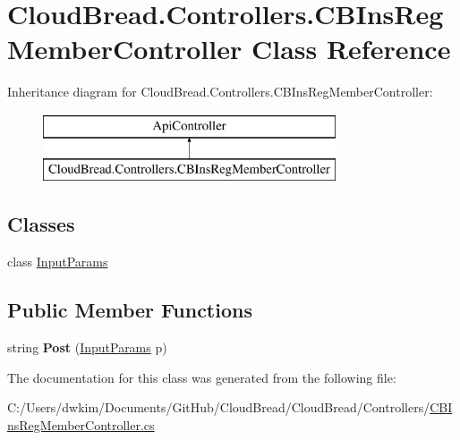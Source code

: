 \hypertarget{a00042}{}\section{Cloud\+Bread.\+Controllers.\+C\+B\+Ins\+Reg\+Member\+Controller Class Reference}
\label{a00042}
Inheritance diagram for Cloud\+Bread.\+Controllers.\+C\+B\+Ins\+Reg\+Member\+Controller\+:\begin{figure}[H]
\begin{center}
\leavevmode
\includegraphics[height=2.000000cm]{a00042}
\end{center}
\end{figure}
\subsection*{Classes}
\begin{DoxyCompactItemize}
\item 
class \hyperlink{a00101}{Input\+Params}
\end{DoxyCompactItemize}
\subsection*{Public Member Functions}
\begin{DoxyCompactItemize}
\item 
string {\bfseries Post} (\hyperlink{a00101}{Input\+Params} p)\hypertarget{a00042_a576b3c4b0be10af8a124ad04d52bcb88}{}\label{a00042_a576b3c4b0be10af8a124ad04d52bcb88}

\end{DoxyCompactItemize}


The documentation for this class was generated from the following file\+:\begin{DoxyCompactItemize}
\item 
C\+:/\+Users/dwkim/\+Documents/\+Git\+Hub/\+Cloud\+Bread/\+Cloud\+Bread/\+Controllers/\hyperlink{a00215}{C\+B\+Ins\+Reg\+Member\+Controller.\+cs}\end{DoxyCompactItemize}
